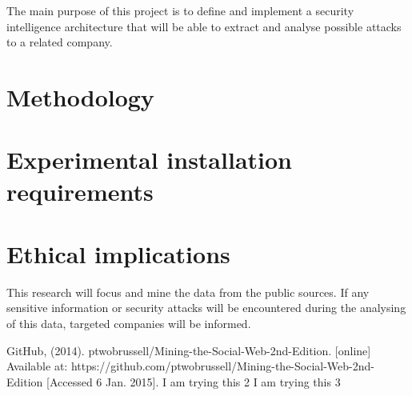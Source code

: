 \documentclass[12pt]{article}
\begin{document}
The main purpose of this project is to define and implement a security intelligence architecture that will be able to extract and analyse possible attacks to a related company. 

 
\section{Methodology}

\section{Experimental installation requirements}


\section{Ethical implications}

This research will focus and mine the data from the public sources. If any sensitive information or security attacks will be encountered during the analysing of this data, targeted companies will be informed. 




\begin{thebibliography}{1}
  GitHub, (2014). ptwobrussell/Mining-the-Social-Web-2nd-Edition. [online] Available at: https://github.com/ptwobrussell/Mining-the-Social-Web-2nd-Edition [Accessed 6 Jan. 2015].
  I am trying this 2 
  I am trying this 3
\end{thebibliography}
\end{document}
